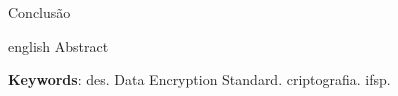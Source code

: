 \documentclass[
	article,			%
	12pt,				%
	oneside,			%
	a4paper,			%
	english,			%
	brazil,				%
	sumario=tradicional
	]{abntex2}
\begin{document}
Conclusão


\postextual


\emptythanks
\maketitle

\renewcommand{\resumoname}{Abstract}
\begin{resumoumacoluna}
 \begin{otherlanguage*}{english}
   Abstract

   \vspace{\onelineskip}

   \noindent
   \textbf{Keywords}: des. Data Encryption Standard. criptografia. ifsp.
 \end{otherlanguage*}
\end{resumoumacoluna}


\end{document}
